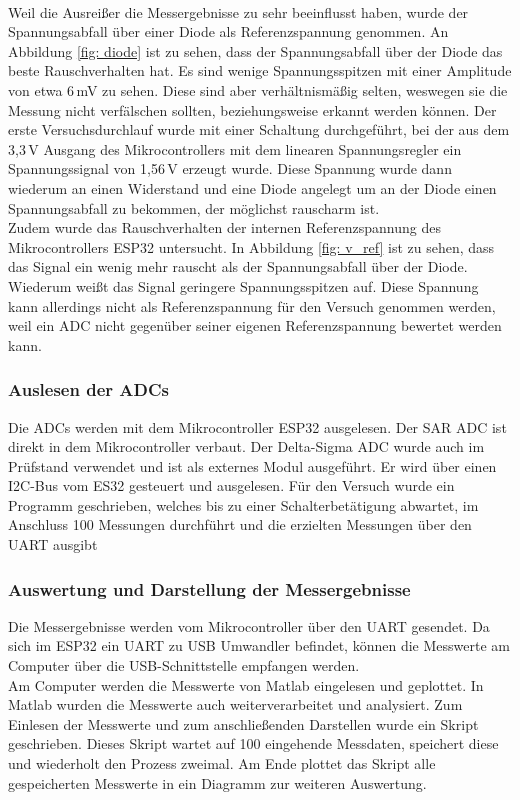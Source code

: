 \\
Weil die Ausreißer die Messergebnisse zu sehr beeinflusst haben, wurde der Spannungsabfall über einer Diode als Referenzspannung genommen. An Abbildung \ref{fig: diode} ist zu sehen, dass der Spannungsabfall über der Diode das beste Rauschverhalten 
hat. Es sind wenige Spannungsspitzen mit einer Amplitude von etwa 6\,mV zu sehen. Diese sind aber verhältnismäßig selten, weswegen sie die Messung nicht verfälschen sollten, beziehungsweise erkannt werden können. Der erste Versuchsdurchlauf wurde mit einer Schaltung durchgeführt, bei der aus dem 3,3\,V Ausgang des Mikrocontrollers mit dem linearen Spannungsregler ein Spannungssignal von 1,56\,V erzeugt wurde. Diese Spannung wurde dann wiederum an einen Widerstand und eine Diode angelegt um an der Diode einen Spannungsabfall zu bekommen, der möglichst rauscharm ist.
\\
Zudem wurde das Rauschverhalten der internen Referenzspannung des Mikrocontrollers ESP32 untersucht. In Abbildung \ref{fig: v_ref} ist zu sehen, dass das Signal ein wenig mehr rauscht als der Spannungsabfall über der Diode. Wiederum weißt das Signal geringere Spannungsspitzen auf. Diese Spannung kann allerdings nicht als Referenzspannung für den Versuch genommen werden, weil ein ADC nicht gegenüber seiner eigenen Referenzspannung bewertet werden kann.

\subsubsection{Auslesen der ADCs}
Die ADCs werden mit dem Mikrocontroller ESP32 ausgelesen. Der SAR ADC ist direkt in dem Mikrocontroller verbaut. Der Delta-Sigma ADC wurde auch im Prüfstand verwendet und ist als externes Modul ausgeführt. Er wird über einen I2C-Bus vom ES32 gesteuert und ausgelesen. Für den Versuch wurde ein Programm geschrieben, welches bis zu einer Schalterbetätigung abwartet, im Anschluss 100 Messungen durchführt und die erzielten Messungen über den UART ausgibt

\subsubsection{Auswertung und Darstellung der Messergebnisse}
Die Messergebnisse werden vom Mikrocontroller über den UART gesendet. Da sich im ESP32 ein UART zu USB Umwandler befindet, können die Messwerte am Computer über die USB-Schnittstelle empfangen werden.\\
Am Computer werden die Messwerte von Matlab eingelesen und geplottet. In Matlab wurden die Messwerte auch weiterverarbeitet und analysiert. Zum Einlesen der Messwerte und zum anschließenden Darstellen wurde ein Skript geschrieben. Dieses Skript wartet auf 100 eingehende Messdaten, speichert diese und wiederholt den Prozess zweimal. Am Ende plottet das Skript alle gespeicherten Messwerte in ein Diagramm zur weiteren Auswertung.

